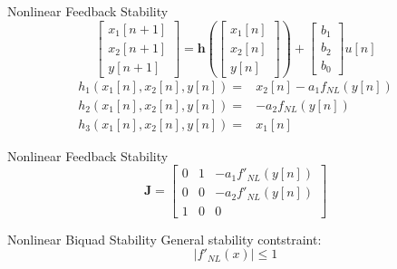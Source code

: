 \begin{frame}{Nonlinear Feedback Stability}
    \begin{equation}
        \begin{bmatrix} x_1[n+1] \\ x_2[n+1] \\ y[n+1] \end{bmatrix} =
        \mathbf{h} \left( \begin{bmatrix} x_1[n] \\ x_2[n] \\ y[n] \end{bmatrix}
        \right) + \begin{bmatrix} b_1\\ b_2\\ b_0 \end{bmatrix} u[n]
    \end{equation}
    \vspace{3ex}
    \begin{equation}
        \begin{split}
            h_1(x_1[n], x_2[n], y[n]) =& x_2[n] - a_1f_{NL}(y[n]) \\
            h_2(x_1[n], x_2[n], y[n]) =& -a_2f_{NL}(y[n]) \\
            h_3(x_1[n], x_2[n], y[n]) =& x_1[n]
        \end{split}
    \end{equation}
\end{frame}

\begin{frame}{Nonlinear Feedback Stability}
    \begin{equation}
        \mathbf{J} = \begin{bmatrix}
            0& 1& -a_1f'_{NL}(y[n]) \\
            0& 0& -a_2f'_{NL}(y[n]) \\
            1& 0& 0
        \end{bmatrix}
    \end{equation}
\end{frame}

\begin{frame}{Nonlinear Biquad Stability}
    General stability contstraint:
    \begin{equation}
        |f'_{NL}(x)| \leq 1
    \end{equation}
\end{frame}
